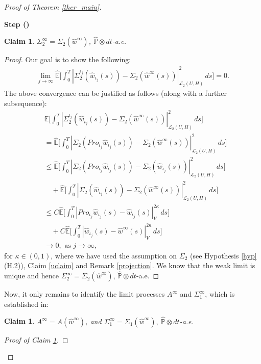 \documentclass[english,a4paper,11pt]{amsart}
\theoremstyle{plain}
\newtheorem{claim}[theorem]{Claim}
\theoremstyle{definition}
\theoremstyle{remark}
\numberwithin{equation}{section}
\newcounter{lil1}
\newenvironment{step}
{\begin{list} { \bf Step (\Roman{lil1})}
		{ \usecounter{lil1}
			\setlength{\leftmargin}{0.0cm}
			\setlength{\topsep}{0.2cm}
			\setlength{\itemsep}{0.0cm}
			\setlength{\parsep}{0.1cm}
			\setlength{\itemindent}{0.8cm}
			\setlength{\parskip}{0.0cm}}}
	{\end{list}}
\newcounter{lil33}
\newcounter{lil1q}
\newcommand{\wh}{\widehat}
\newcommand{\PP}{{\mathbb{P}}}
\newcommand{\EE}{ \mathbb{E} }
\newcommand{\Pro}{Pro}
\begin{document}
\begin{proof}[Proof of Theorem \ref{ther_main}]
\begin{step}
\begin{claim}\label{Sigma_2lim}
	$\Sigma_2^\infty=\Sigma_2(\wh{w}^\infty)$, $\widehat{\PP}\otimes dt$-a.e.
\end{claim}
\begin{proof}  Our goal is to show the following: 
	\begin{align*}
		\lim_{j\to\infty} \wh{\EE}\bigg[\int_0^T  | \Sigma_2^{\iota_j}(\wh{w}_{\iota_j}(s))-\Sigma_2(\wh{w}^\infty(s)) | _{\mathcal{L}_2(U,H)}^2\,ds\bigg]=0. 
	\end{align*}The above convergence can be justified as follows (along with a further subsequence):
	\begin{align*}
		&\wh{\EE}\bigg[\int_0^T  | \Sigma_2^{\iota_j}(\wh{w}_{\iota_j}(s))-\Sigma_2(\wh{w}^\infty(s)) | _{\mathcal{L}_2(U,H)}^2\,ds\bigg]\\&=
		\wh{\EE}\bigg[\int_0^T  | \Sigma_2(\Pro_{\iota_j}\wh{w}_{\iota_j}(s))-\Sigma_2(\wh{w}^\infty(s)) | _{\mathcal{L}_2(U,H)}^2\,ds\bigg]
		\\&\leq  	\wh{\EE}\bigg[\int_0^T  | \Sigma_2(\Pro_{\iota_j}\wh{w}_{\iota_j}(s))-\Sigma_2(\wh{w}_{\iota_j}(s)) | _{\mathcal{L}_2(U,H)}^2\,ds\bigg]\\&\quad + \wh{\EE}\bigg[\int_0^T  | \Sigma_2(\wh{w}_{\iota_j}(s)) -\Sigma_2(\wh{w}^\infty(s)) | _{\mathcal{L}_2(U,H)}^2\,ds\bigg]
		\\& \leq 
		C \wh{\EE}\bigg[\int_0^T  | \Pro_{\iota_j}\wh{w}_{\iota_j}(s)-\wh{w}_{\iota_j}(s) | _V^{2 \kappa}\,ds\bigg]
		\\&\quad +C \wh{\EE}\bigg[\int_0^T | \wh{w}_{\iota_j}(s) -\wh{w}^\infty(s) | _V^{2\kappa}\,ds\bigg]
		\\&
		\to 0, \text{ as } j\to \infty,
	\end{align*}
for $\kappa\in(0,1)$, where we have used the assumption on $\Sigma_2$ (see Hypothesis \ref{hyp} (H.2)), Claim \ref{uclaim} and Remark \ref{projection}. We know that the weak limit is unique and hence $\Sigma_2^\infty=\Sigma_2(\wh{w}^\infty)$, $\wh{\PP}\otimes dt$-a.e.
\end{proof}



Now, it only remains to identify the limit processes $A^\infty$ and $\Sigma_1^\infty$, which is established in:
%
\begin{claim}\label{A_lim}
	$A^{\infty}=A(\wh{w}^\infty)$,  and  $ \Sigma_1^\infty=\Sigma_1(\wh{w}^{\infty}), \ \wh{\PP}\otimes dt$-a.e.
\end{claim}
\begin{proof}[Proof of Claim \ref{A_lim}]


\end{proof}
\end{step}
\end{proof}
\end{document}
